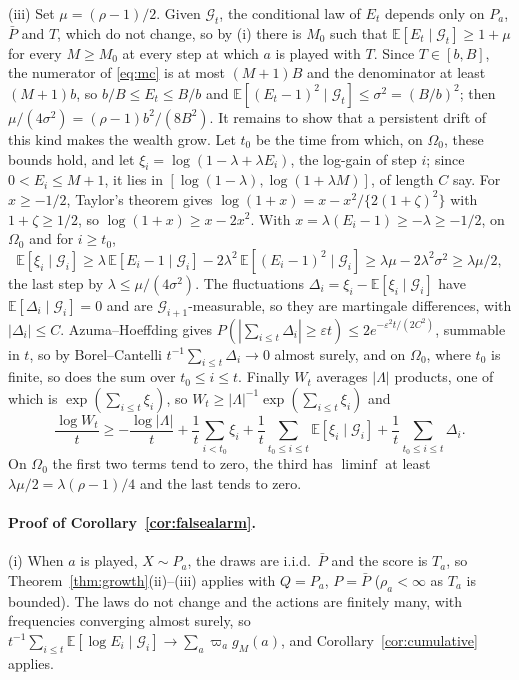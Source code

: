 \documentclass[pdflatex,sn-mathphys-ay]{sn-jnl}
\newcommand{\E}{\mathbb{E}}
\newcommand{\G}{\mathcal{G}}
\theoremstyle{thmstyleone}
\theoremstyle{thmstyletwo}
\begin{document}
\begin{appendices}
(iii) Set $\mu = (\rho - 1)/2$. Given $\G_t$, the conditional law of $E_t$
depends only on $P_a$, $\bar P$ and $T$, which do not change, so by (i) there
is $M_0$ such that $\E[E_t \mid \G_t] \ge 1 + \mu$ for every $M \ge M_0$ at
every step at which $a$ is played with $T$. Since $T \in [b, B]$, the
numerator of \eqref{eq:mc} is at most $(M+1)B$ and the denominator at least
$(M+1)b$, so $b/B \le E_t \le B/b$ and
$\E[(E_t - 1)^2 \mid \G_t] \le \sigma^2 = (B/b)^2$; then
$\mu/(4\sigma^2) = (\rho-1)b^2/(8B^2)$. It remains to show that a persistent
drift of this kind makes the wealth grow. Let $t_0$ be the time from which,
on $\Omega_0$, these bounds hold, and let
$\xi_i = \log(1 - \lambda + \lambda E_i)$, the log-gain of step $i$;
since $0 < E_i \le M+1$, it lies in $[\log(1-\lambda), \log(1+\lambda M)]$, of
length $C$ say. For $x \ge -1/2$, Taylor's theorem gives
$\log(1+x) = x - x^2/\{2(1+\zeta)^2\}$ with $1+\zeta \ge 1/2$, so
$\log(1+x) \ge x - 2x^2$. With $x = \lambda(E_i - 1) \ge -\lambda \ge -1/2$, on
$\Omega_0$ and for $i \ge t_0$,
\[
\E[\xi_i \mid \G_i] \ge \lambda\,\E[E_i - 1 \mid \G_i] - 2\lambda^2\,\E[(E_i-1)^2 \mid \G_i]
\ge \lambda\mu - 2\lambda^2\sigma^2 \ge \lambda\mu/2,
\]
the last step by $\lambda \le \mu/(4\sigma^2)$. The fluctuations
$\Delta_i = \xi_i - \E[\xi_i \mid \G_i]$ have $\E[\Delta_i \mid \G_i] = 0$ and are
$\G_{i+1}$-measurable, so they are martingale differences, with
$|\Delta_i| \le C$. Azuma--Hoeffding \citep{azuma1967weighted} gives
$P(|\sum_{i \le t}\Delta_i| \ge \varepsilon t) \le 2e^{-\varepsilon^2 t/(2C^2)}$,
summable in $t$, so by Borel--Cantelli $t^{-1}\sum_{i \le t}\Delta_i \to 0$
almost surely, and on $\Omega_0$, where $t_0$ is finite, so does the sum over
$t_0 \le i \le t$. Finally $W_t$ averages $|\Lambda|$ products, one of which is
$\exp(\sum_{i \le t}\xi_i)$, so $W_t \ge |\Lambda|^{-1}\exp(\sum_{i \le t}\xi_i)$ and
\[
\frac{\log W_t}{t} \ge -\frac{\log|\Lambda|}{t} + \frac1t\sum_{i < t_0} \xi_i
+ \frac1t\sum_{t_0 \le i \le t} \E[\xi_i \mid \G_i] + \frac1t\sum_{t_0 \le i \le t}\Delta_i .
\]
On $\Omega_0$ the first two terms tend to zero, the third has $\liminf$ at
least $\lambda\mu/2 = \lambda(\rho-1)/4$ and the last tends to zero.

\paragraph{Proof of Corollary~\ref{cor:falsealarm}.}
(i) When $a$ is played, $X \sim P_a$, the draws are i.i.d.\ $\bar P$ and the
score is $T_a$, so Theorem~\ref{thm:growth}(ii)--(iii) applies with $Q = P_a$,
$P = \bar P$ ($\rho_a < \infty$ as $T_a$ is bounded). The laws do not change and
the actions are finitely many, with frequencies converging almost surely, so
$t^{-1}\sum_{i \le t}\E[\log E_i \mid \G_i] \to \sum_a \varpi_a g_M(a)$, and
Corollary~\ref{cor:cumulative} applies.


\end{appendices}
\end{document}
